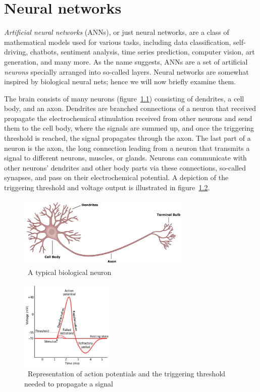 \chapter{Neural networks}\label{ch:neural-networks}


\textit{Artificial neural networks} (ANNs), or just neural networks, are a class of mathematical models used for various tasks, including data classification, self-driving, chatbots, sentiment analysis, time series prediction, computer vision, art generation, and many more.
As the name suggests, ANNs are a set of artificial \textit{neurons} specially arranged into so-called layers.
Neural networks are somewhat inspired by biological neural nets;
hence we will now briefly examine them.~\cite{ann-basics}

The brain consists of many neurons (figure~\ref{fig:bio-neuron}) consisting of dendrites, a cell body, and an axon.
Dendrites are branched connections of a neuron that received propagate the electrochemical stimulation received from other neurons and send them to the cell body, where the signals are summed up, and once the triggering threshold is reached, the signal propagates through the axon.
The last part of a neuron is the axon, the long connection leading from a neuron that transmits a signal to different neurons, muscles, or glands.
Neurons can communicate with other neurons' dendrites and other body parts via these connections, so-called synapses, and pass on their electrochemical potential.
A depiction of the triggering threshold and voltage output is illustrated in figure~\ref{fig:bio-neuron-activation}.~\cite{ann-basics}

\begin{figure}
    \centering
    \includegraphics[width=0.74\textwidth]{assets/biological-neuron}
    \caption{~A typical biological neuron~\cite{ann-basics}}\label{fig:bio-neuron}
\end{figure}


\begin{figure}
    \centering
    \includegraphics[width=0.4\textwidth]{assets/biological-neuron-activation}
    \caption{~Representation of action potentials and the triggering threshold needed to propagate a signal~\cite{ann-basics}}\label{fig:bio-neuron-activation}
\end{figure}


